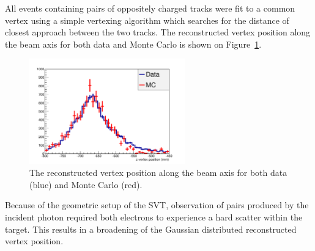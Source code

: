 All events containing pairs of oppositely charged tracks were fit to a
common vertex using a simple vertexing algorithm which searches for the distance
of closest approach between the two tracks.  The reconstructed vertex position
along the beam axis for both data and Monte Carlo is shown on 
Figure~\ref{fig:vz_position}.
\begin{figure}[h]
    \begin{center}
    	\includegraphics[width=0.60\textwidth]{test2012/svtperformance/trk_performance/zvertex.pdf}
        \caption{  
                    The reconstructed vertex position along the beam axis for
                    both data (blue) and Monte Carlo (red).
                } 
	\label{fig:vz_position}
    \end{center}
\end{figure}
Because of the geometric setup of the SVT, observation of pairs produced by
the incident photon required both electrons to experience a hard scatter
within the target.  This results in a broadening of the Gaussian 
distributed reconstructed vertex position. 

